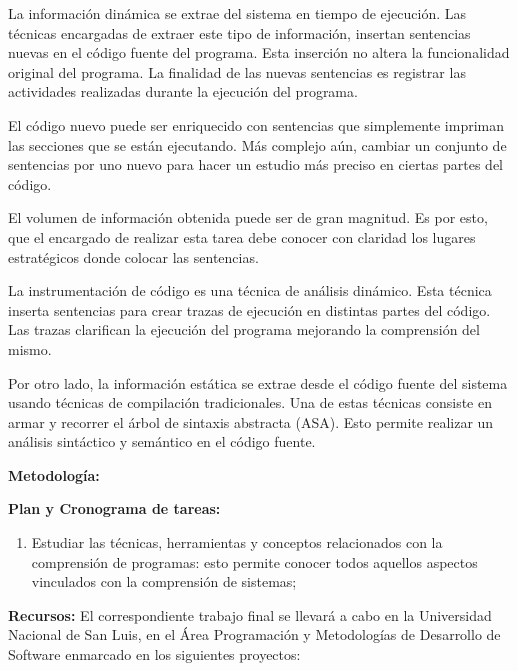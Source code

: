 \documentclass[a4paper,12pt]{report}
\begin{document}
\hspace{0.5cm}La información dinámica se extrae del sistema en tiempo de ejecución. Las técnicas encargadas de extraer este tipo de información, insertan sentencias nuevas en el código fuente del programa. Esta inserción no altera la funcionalidad original del programa. La finalidad de las nuevas sentencias es registrar las actividades realizadas durante la ejecución del programa. 

\hspace{0.5cm}El código nuevo puede ser enriquecido con sentencias que simplemente impriman las secciones que se están ejecutando. Más complejo aún, cambiar un conjunto de sentencias por uno nuevo para hacer un estudio más preciso en ciertas partes del código.

\hspace{0.5cm}El volumen de información obtenida puede ser de gran magnitud. Es por esto, que el encargado de realizar esta tarea debe conocer con claridad los lugares estratégicos donde colocar las sentencias.

\hspace{0.5cm}La instrumentación de código es una técnica de análisis dinámico. Esta técnica inserta sentencias para crear trazas de ejecución en distintas partes del código. Las trazas clarifican la ejecución del programa mejorando la comprensión del mismo.

\hspace{0.5cm}Por otro lado, la información estática se extrae desde el código fuente del sistema usando 
técnicas de compilación tradicionales. Una de estas técnicas consiste en armar y recorrer el árbol de sintaxis abstracta (ASA). Esto permite realizar un análisis sintáctico y semántico en el código fuente.

\textbf{Metodología:}
\vskip0.5cm



\textbf{Plan y Cronograma de tareas:}
\vskip0.5cm


\begin{enumerate}
\itemsep0em%
\item Estudiar las técnicas, herramientas y conceptos relacionados con la comprensión de programas: esto permite conocer todos aquellos aspectos vinculados con la comprensión de sistemas;
\end{enumerate}

\textbf{Recursos:}
\vskip0.5cm
\hspace{0.5cm}El correspondiente trabajo final se llevará a cabo en la Universidad Nacional de San Luis, en el Área Programación y Metodologías de Desarrollo de Software enmarcado en los siguientes proyectos:
\end{document}
